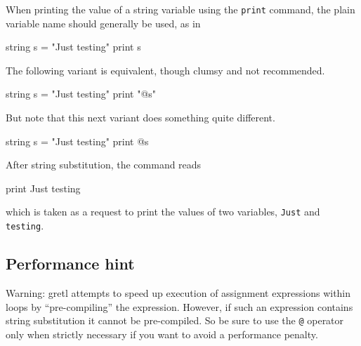 When printing the value of a string variable using the \texttt{print}
command, the plain variable name should generally be used, as in
%
\begin{code}
string s = "Just testing"
print s
\end{code}
%
The following variant is equivalent, though clumsy and not
recommended.
%
\begin{code}
string s = "Just testing"
print "@s"
\end{code}
%
But note that this next variant does something quite different.
%
\begin{code}
string s = "Just testing"
print @s
\end{code}
%
After string substitution, the command reads
%
\begin{code}
print Just testing
\end{code}
%
which is taken as a request to print the values of two variables,
\texttt{Just} and \texttt{testing}.

\subsection{Performance hint}

Warning: gretl attempts to speed up execution of assignment
expressions within loops by ``pre-compiling'' the expression.
However, if such an expression contains string substitution it cannot
be pre-compiled. So be sure to use the \verb|@| operator only when
strictly necessary if you want to avoid a performance penalty.

